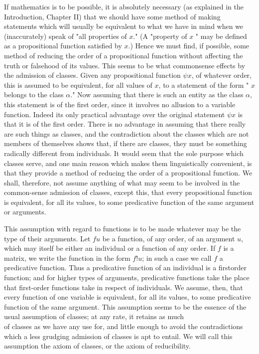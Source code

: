 \documentclass[10pt]{article}
\begin{document}
If mathematics is to be possible, it is absolutely necessary (as explained in the Introduction, Chapter II) that we should have some method of making statements which will usually be equivalent to what we have in mind when we (inaccurately) speak of "all properties of $x$." (A "property of $x$ " may be defined as a propositional function satisfied by $x$.) Hence we must find, if possible, some method of reducing the order of a propositional function without affecting the truth or falsehood of its values. This seems to be what commonsense effects by the admission of classes. Given any propositional function $\psi x$, of whatever order, this is assumed to be equivalent, for all values of $x$, to a statement of the form " $x$ belongs to the class $\alpha$." Now assuming that there is such an entity as the class $\alpha$, this statement is of the first order, since it involves no allusion to a variable function. Indeed its only practical advantage over the original statement $\psi x$ is that it is of the first order. There is no advantage in assuming that there really are such things as classes, and the contradiction about the classes which are not members of themselves shows that, if there are classes, they must be something radically different from individuals. It would seem that the sole purpose which classes serve, and one main reason which makes them linguistically convenient, is that they provide a method of reducing the order of a propositional function. We shall, therefore, not assume anything of what may seem to be involved in the common-sense admission of classes, except this, that every propositional function is equivalent, for all its values, to some predicative function of the same argument or arguments.

This assumption with regard to functions is to be made whatever may be the type of their arguments. Let $f u$ be a function, of any order, of an argument $u$, which may itself be either an individual or a function of any order. If $f$ is a matrix, we write the function in the form $f!u$; in such a case we call $f$ a predicative function. Thus a predicative function of an individual is a firstorder function; and for higher types of arguments, predicative functions take the place that first-order functions take in respect of individuals. We assume, then, that every function of one variable is equivalent, for all its values, to some predicative function of the same argument. This assumption seems to be the essence of the usual assumption of classes; at any rate, it retains as much\\
of classes as we have any use for, and little enough to avoid the contradictions which a less grudging admission of classes is apt to entail. We will call this assumption the axiom of classes, or the axiom of reducibility.
\end{document}
